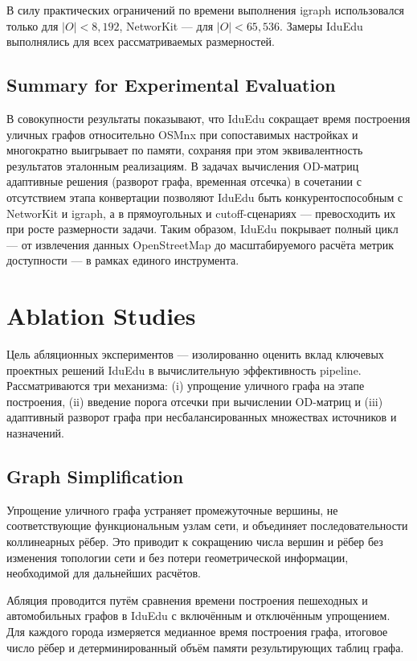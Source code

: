 \documentclass[sigconf,nonacm]{acmart}
\begin{document}
    В силу практических ограничений по времени выполнения igraph использовался только для $|O| < 8{,}192$, NetworKit — для $|O| < 65{,}536$.
    Замеры IduEdu выполнялись для всех рассматриваемых размерностей.

    \subsection{Summary for Experimental Evaluation}
    \label{subsec:summary-for-experimental-evaluation}
    В совокупности результаты показывают, что IduEdu сокращает время построения уличных графов относительно OSMnx при сопоставимых
    настройках и многократно выигрывает по памяти, сохраняя при этом эквивалентность результатов эталонным реализациям.
    В задачах вычисления OD-матриц адаптивные решения (разворот графа, временная отсечка) в сочетании с отсутствием этапа конвертации
    позволяют IduEdu быть конкурентоспособным с NetworKit и igraph, а в прямоугольных и cutoff-сценариях — превосходить их при росте размерности задачи.
    Таким образом, IduEdu покрывает полный цикл — от извлечения данных OpenStreetMap до масштабируемого расчёта метрик доступности — в рамках единого инструмента.


    \section{Ablation Studies}
    \label{sec:ablation-studies}

    Цель абляционных экспериментов — изолированно оценить вклад ключевых проектных решений IduEdu в вычислительную эффективность pipeline.
    Рассматриваются три механизма: (i) упрощение уличного графа на этапе построения, (ii) введение порога отсечки при вычислении
    OD-матриц и (iii) адаптивный разворот графа при несбалансированных множествах источников и назначений.

    \subsection{Graph Simplification}
    \label{subsec:graph-simplification}

    Упрощение уличного графа устраняет промежуточные вершины, не соответствующие функциональным узлам сети, и объединяет последовательности коллинеарных рёбер.
    Это приводит к сокращению числа вершин и рёбер без изменения топологии сети и без потери геометрической информации, необходимой для дальнейших расчётов.

    Абляция проводится путём сравнения времени построения пешеходных и автомобильных графов в IduEdu с включённым и отключённым упрощением.
    Для каждого города измеряется медианное время построения графа, итоговое число рёбер и детерминированный объём памяти результирующих таблиц графа.
\end{document}
